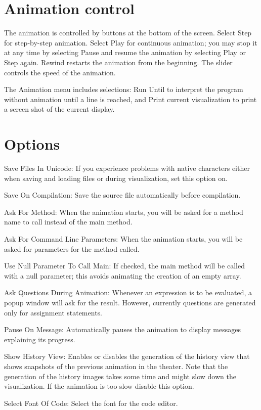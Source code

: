\documentclass{article}
\begin{document}
\section{Animation control}
The animation is controlled by buttons at the bottom of the screen. Select Step 
for step-by-step animation. Select Play for continuous animation; you may stop 
it at any time by selecting Pause and resume the animation by selecting Play 
or Step again. Rewind restarts the animation from the beginning. The slider controls 
the speed of the animation.

The Animation menu includes selections: Run Until to interpret the program
without animation until a line is reached, and Print current visualization to
print a screen shot of the current display.

\section{Options}

Save Files In Unicode: If you experience problems with native characters
either when saving and loading files or during visualization, set this option on.

Save On Compilation: Save the source file automatically before compilation.

Ask For Method: When the animation starts, you will be asked for a method name
to call instead of the main method.

Ask For Command Line Parameters: When the animation starts, you will be asked
for parameters for the method called.

Use Null Parameter To Call Main: If checked, the main method will be called 
with a null parameter; this avoids animating the creation of an empty array.

Ask Questions During Animation: Whenever an expression is to be evaluated, a 
popup window will ask for the result. However, currently questions are generated only for assignment statements.

Pause On Message: Automatically pauses the animation to display messages
explaining its progress.

Show History View: Enables or disables the generation of the history view that
shows snapshots of the previous animation in the theater. Note that the generation of
the history images takes some time and might slow down the visualization. If the animation
is too slow disable this option.

Select Font Of Code: Select the font for the code editor.
\end{document}
